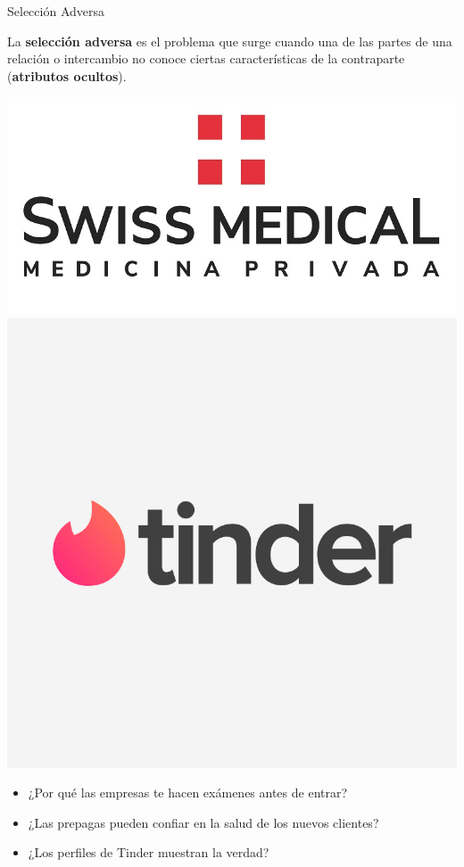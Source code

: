 \documentclass{beamer}
\begin{document}
\begin{frame}{Selección Adversa}
    \begin{boxB}
        \centering
        La \textbf{selección adversa} es el problema que surge cuando una de las partes de una relación o intercambio no conoce ciertas características de la contraparte (\textbf{atributos ocultos}).
    \end{boxB}
    \vspace{2mm}
    \centering
    \includegraphics[scale=0.5]{../Figures/M18.7.jpg} \hspace{2mm}
    \includegraphics[scale=0.07]{../Figures/M18.6.png}
    \vspace{2mm}
    \begin{itemize}
        \item ¿Por qué las empresas te hacen exámenes antes de entrar?
        \item ¿Las prepagas pueden confiar en la salud de los nuevos clientes?
        \item ¿Los perfiles de Tinder muestran la verdad?
    \end{itemize}
\end{frame}
\end{document}
